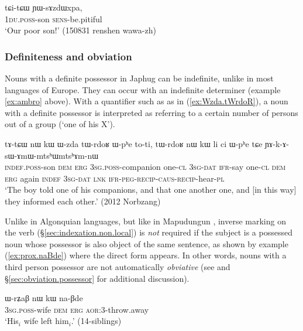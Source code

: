\begin{exe}
\ex \label{ex:tCitCW.YWsAzdWxpa}
\gll tɕi-tɕɯ ɲɯ-sɤzdɯxpa,  \\
\textsc{1du}.\textsc{poss}-son \textsc{sens}-be.pitiful \\
\glt `Our poor son!' (150831 renshen wawa-zh) 
\end{exe}


\subsubsection{Definiteness and obviation} \label{sec:possessive.prefix.obv.def}
Nouns with a definite possessor in Japhug can be indefinite, unlike in most languages of Europe. They can occur with an indefinite determiner (example \ref{ex:ambro}  above). With a quantifier such as  as in (\ref{ex:Wzda.tWrdoR}), a noun with a definite possessor is interpreted as referring to a certain number of persons out of a group (`one of his X').

 \begin{exe}
\ex \label{ex:Wzda.tWrdoR}
\gll tɤ-tɕɯ nɯ kɯ ɯ-zda tɯ-rdoʁ ɯ-pʰe to-ti, tɯ-rdoʁ nɯ kɯ li ci ɯ-pʰe tɕe ɲɤ-k-ɤ-sɯ-ɤmɯ-mtsʰɯ\redp{}mtsʰɤm-nɯ \\
\textsc{indef}.\textsc{poss}-son \textsc{dem} \textsc{erg} \textsc{3sg}.\textsc{poss}-companion one-\textsc{cl} \textsc{3sg}-\textsc{dat} \textsc{ifr}-say one-\textsc{cl}  \textsc{dem} \textsc{erg} again \textsc{indef} \textsc{3sg}-\textsc{dat} \textsc{lnk}   \textsc{ifr}-\textsc{peg}-\textsc{recip}-\textsc{caus}-\textsc{recip}-hear-\textsc{pl} \\
\glt `The boy told one of his companions, and that one another one, and [in this way] they informed each other.' (2012 Norbzang)
\end{exe}

Unlike in Algonquian languages, but like in Mapudungun \citep{haude16symmetrical}, inverse marking on the verb (§\ref{sec:indexation.non.local}) is \textit{not} required if the subject is a possessed noun whose possessor is also object of the same sentence, as shown by example (\ref{ex:prox.naBde}) where the direct form  appears. In other words, nouns with a third person possessor are not automatically \textit{obviative} (see \citealt{jacques10inverse} and §\ref{sec:obviation.possessor} for additional discussion).

\begin{exe}
\ex \label{ex:prox.naBde}
\gll ɯ-rʑaβ nɯ kɯ na-βde \\
\textsc{3sg}.\textsc{poss}-wife \textsc{dem} \textsc{erg} \textsc{aor}:3\flobv{}-throw.away \\
\glt `His$_i$ wife left him$_i$.' (14-siblings)
\end{exe}

